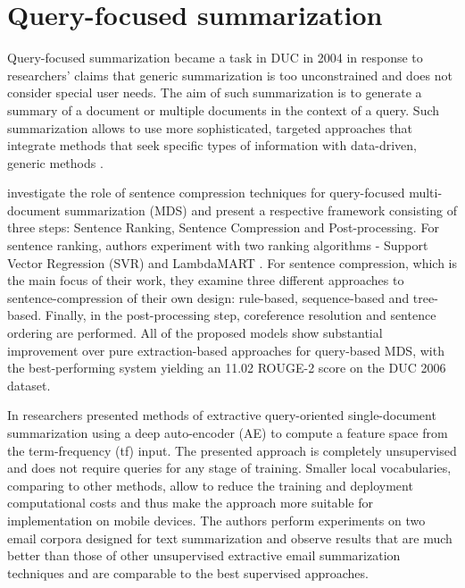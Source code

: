\documentclass[11pt,a4paper,onecolumn]{article}
\begin{document}
\section{Query-focused summarization}
Query-focused summarization became a task in DUC in 2004 in response to researchers' claims that generic summarization is too unconstrained and does not consider special user needs.
The aim of such summarization is to generate a summary of a document or multiple documents in the context of a query.
Such summarization allows to use more sophisticated, targeted approaches that integrate methods that seek specific types of information with data-driven, generic methods \cite{nenkova2011automatic}.

\cite{wang2016sentence} investigate the role of sentence compression techniques for query-focused multi-document summarization (MDS) and present a respective framework consisting of three steps: Sentence Ranking, Sentence Compression and Post-processing.
For sentence ranking, authors experiment with two ranking algorithms - Support Vector Regression (SVR) \cite{mozer1997} and LambdaMART \cite{burges2007learning}.
For sentence compression, which is the main focus of their work, they examine three different approaches to sentence-compression of their own design: rule-based, sequence-based and tree-based.
Finally, in the post-processing step, coreference resolution and sentence ordering are performed.
All of the proposed models show substantial improvement over pure extraction-based approaches for query-based MDS, with the best-performing system yielding an 11.02 ROUGE-2 score on the DUC 2006 dataset.

In \cite{yousefi2017text} researchers presented methods of extractive query-oriented single-document summarization using a deep auto-encoder (AE) to compute a feature space from the term-frequency (tf) input.
The presented approach is completely unsupervised and does not require queries for any stage of training.
Smaller local vocabularies, comparing to other methods, allow to reduce the training and deployment computational costs and thus make the approach more suitable for implementation on mobile devices.
The authors perform experiments on two email corpora designed for text summarization and observe results that are much better than those of other unsupervised extractive email summarization techniques and are comparable to the best supervised approaches.
\end{document}
